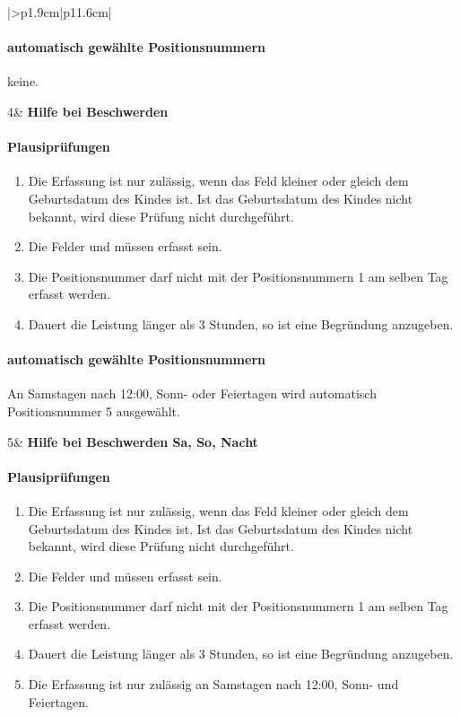 \begin{mpsupertabular}{|>{\centering}p{1.9cm}|p{11.6cm}|}
\paragraph{automatisch gewählte Positionsnummern}
keine.
\\ \hline


4&
\textbf{Hilfe bei Beschwerden}
\paragraph{Plausiprüfungen}
\begin{enumerate}
\item
Die Erfassung ist nur zulässig, wenn das Feld  kleiner 
oder gleich dem Geburtsdatum des Kindes ist. Ist das Geburtsdatum des
Kindes nicht bekannt, wird diese Prüfung nicht durchgeführt.
\item
Die Felder  und  müssen erfasst sein.
\item
Die Positionsnummer darf nicht mit der Positionsnummern 1 am
selben Tag erfasst werden.
\item
Dauert die Leistung länger als 3 Stunden, so ist eine Begründung anzugeben.
\end{enumerate}
\paragraph{automatisch gewählte Positionsnummern}
An Samstagen nach 12:00, Sonn- oder Feiertagen wird automatisch Positionsnummer
5 ausgewählt.
\\ \hline


5&
\textbf{Hilfe bei Beschwerden Sa, So, Nacht}
\paragraph{Plausiprüfungen}
\begin{enumerate}
\item
Die Erfassung ist nur zulässig, wenn das Feld  kleiner 
oder gleich dem Geburtsdatum des Kindes ist. Ist das Geburtsdatum des
Kindes nicht bekannt, wird diese Prüfung nicht durchgeführt.
\item
Die Felder  und  müssen erfasst sein.
\item
Die Positionsnummer darf nicht mit der Positionsnummern 1 am
selben Tag erfasst werden.
\item
Dauert die Leistung länger als 3 Stunden, so ist eine Begründung anzugeben.
\item
Die Erfassung ist nur zulässig an Samstagen nach 12:00, Sonn- und Feiertagen.
\end{enumerate}

\end{mpsupertabular}

